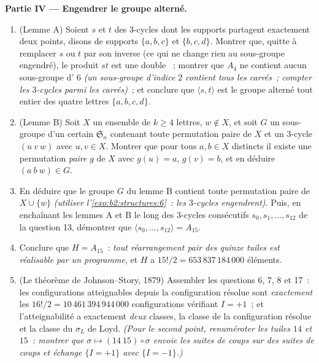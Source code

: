 \begin{problem}
\medskip
\noindent\textbf{Partie IV --- Engendrer le groupe alterné.}
\begin{enumerate}[resume]
  \item (Lemme A) Soient $s$ et $t$ des $3$-cycles dont les supports
        partagent exactement deux points, disons de supports $\{a, b,
        c\}$ et $\{b, c, d\}$. Montrer que, quitte à remplacer $s$ ou
        $t$ par son inverse (ce qui ne change rien au sous-groupe
        engendré), le produit $st$ est une double ~;
        montrer que $A_4$ ne contient aucun sous-groupe d' $6$
        \emph{(un sous-groupe d'indice $2$ contient tous les carrés~;
        compter les $3$-cycles parmi les carrés)}~; et conclure que
        $\langle s, t\rangle$ est le groupe alterné tout entier des
        quatre lettres $\{a, b, c, d\}$.
  \item (Lemme B) Soit $X$ un ensemble de $k \geq 4$ lettres, $w
        \notin X$, et soit $G$ un sous-groupe d'un certain
        $\mathfrak{S}_n$ contenant toute permutation paire de $X$
        et un $3$-cycle $(u\ v\ w)$ avec $u, v \in X$. Montrer que
        pour tous $a, b \in X$ distincts il existe une permutation
        \emph{paire} $g$ de $X$ avec $g(u) = a$, $g(v) = b$, et en
        déduire $(a\ b\ w) \in G$.
  \item En déduire que le groupe $G$ du lemme B contient toute
        permutation paire de $X \cup \{w\}$ \emph{(utiliser
        l'\cref{exo:b2:structures:6}~: les $3$-cycles engendrent)}.
        Puis, en enchaînant les lemmes A et B le long des
        $3$-cycles consécutifs $s_0, s_1, \dots, s_{12}$ de la
        question 13, démontrer que $\langle s_0, \dots, s_{12}\rangle
        = A_{15}$.
  \item Conclure que $H = A_{15}$~: \emph{tout réarrangement pair des
        quinze tuiles est réalisable par un programme}, et $H$
        a $15!/2 = 653\,837\,184\,000$ éléments.
  \item (Le théorème de Johnson--Story, 1879) Assembler les questions
        6, 7, 8 et 17~: les configurations atteignables depuis la
        configuration résolue sont \emph{exactement} les $16!/2 =
        10\,461\,394\,944\,000$ configurations vérifiant $I = +1$~;
        et l'atteignabilité a exactement \emph{deux} classes, la
        classe de la configuration résolue et la classe du $\sigma_L$
        de Loyd. \emph{(Pour le second point, renuméroter les tuiles
        $14$ et $15$~: montrer que $\sigma \mapsto (14\ 15) \circ
        \sigma$ envoie les suites de coups sur des suites de coups et
        échange $\{I = +1\}$ avec $\{I = -1\}$.)}
\end{enumerate}


\end{problem}
